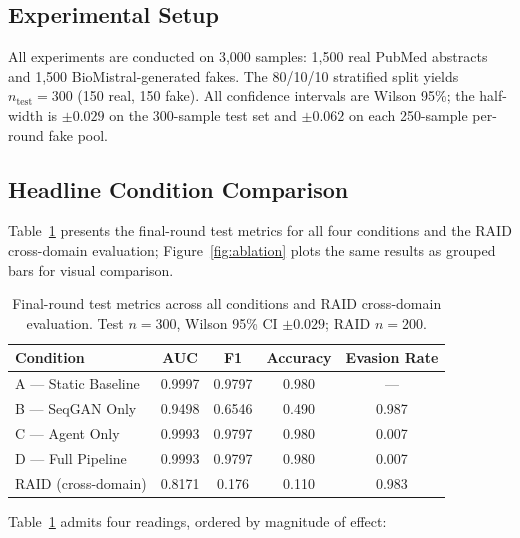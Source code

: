 \documentclass[12pt,a4paper]{article}
\begin{document}
\subsection{Experimental Setup}

All experiments are conducted on 3,000 samples: 1,500 real PubMed abstracts
and 1,500 BioMistral-generated fakes. The 80/10/10 stratified split yields
$n_{\text{test}} = 300$ (150 real, 150 fake). All confidence intervals are
Wilson 95\%; the half-width is $\pm 0.029$ on the 300-sample test set and
$\pm 0.062$ on each 250-sample per-round fake pool.

\subsection{Headline Condition Comparison}

Table~\ref{tab:headline} presents the final-round test metrics for all
four conditions and the RAID cross-domain evaluation; Figure~\ref{fig:ablation}
plots the same results as grouped bars for visual comparison.

\begin{table}[H]
\centering
\caption{Final-round test metrics across all conditions and RAID cross-domain
evaluation. Test $n=300$, Wilson 95\% CI $\pm 0.029$; RAID $n=200$.}
\label{tab:headline}
\renewcommand{\arraystretch}{1.25}
\begin{tabular}{@{}lcccc@{}}
\toprule
\textbf{Condition} & \textbf{AUC} & \textbf{F1} & \textbf{Accuracy} & \textbf{Evasion Rate} \\
\midrule
A — Static Baseline  & 0.9997 & 0.9797 & 0.980 & ---   \\
B — SeqGAN Only      & 0.9498 & 0.6546 & 0.490 & 0.987 \\
C — Agent Only       & 0.9993 & 0.9797 & 0.980 & 0.007 \\
D — Full Pipeline    & 0.9993 & 0.9797 & 0.980 & 0.007 \\
\midrule
RAID (cross-domain)  & 0.8171 & 0.176  & 0.110 & 0.983 \\
\bottomrule
\end{tabular}
\end{table}

Table~\ref{tab:headline} admits four readings, ordered by magnitude of
effect:
\end{document}
